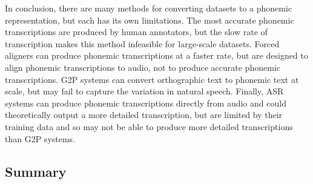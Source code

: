 In conclusion, there are many methods for converting datasets to a phonemic representation, but each has its own limitations. The most accurate phonemic transcriptions are produced by human annotators, but the slow rate of transcription makes this method infeasible for large-scale datasets. Forced aligners can produce phonemic transcriptions at a faster rate, but are designed to align phonemic transcriptions to audio, not to produce accurate phonemic transcriptions. G2P systems can convert orthographic text to phonemic text at scale, but may fail to capture the variation in natural speech. Finally, ASR systems can produce phonemic transcriptions directly from audio and could theoretically output a more detailed transcription, but are limited by their training data and so may not be able to produce more detailed transcriptions than G2P systems.








\subsection{Summary}
\label{sec:dataset-background-summary}

